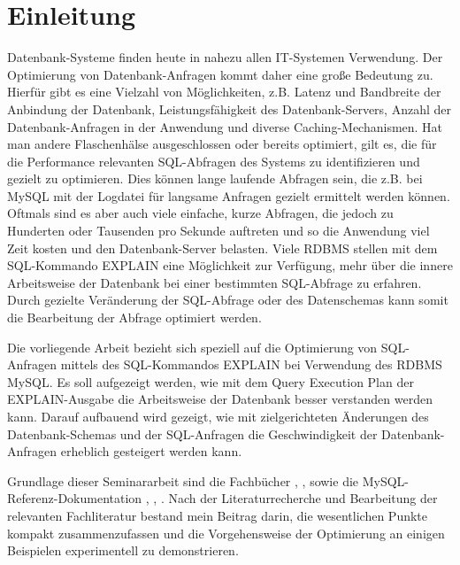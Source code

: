 \section{Einleitung}
Datenbank-Systeme finden heute in nahezu allen IT-Systemen Verwendung.
Der Optimierung von Datenbank-Anfragen kommt daher eine große Bedeutung zu.
Hierfür gibt es eine Vielzahl von Möglichkeiten, z.B. Latenz und Bandbreite der Anbindung der Datenbank, Leistungsfähigkeit des Datenbank-Servers, Anzahl der Datenbank-Anfragen in der Anwendung und diverse Caching-Mechanismen.
Hat man andere Flaschenhälse ausgeschlossen oder bereits optimiert, gilt es, die für die Performance relevanten SQL-Abfragen des Systems zu identifizieren und gezielt zu optimieren. Dies können lange laufende Abfragen sein, die z.B. bei MySQL mit der Logdatei für langsame Anfragen gezielt ermittelt werden können. Oftmals sind es aber auch viele einfache, kurze Abfragen, die jedoch zu Hunderten oder Tausenden pro Sekunde auftreten und so die Anwendung viel Zeit kosten und den Datenbank-Server belasten.
Viele RDBMS stellen mit dem SQL-Kommando EXPLAIN eine Möglichkeit zur Verfügung, mehr über die innere Arbeitsweise der Datenbank bei einer bestimmten SQL-Abfrage zu erfahren. Durch gezielte Veränderung der SQL-Abfrage oder des Datenschemas kann somit die Bearbeitung der Abfrage optimiert werden.

Die vorliegende Arbeit bezieht sich speziell auf die Optimierung von SQL-Anfragen mittels des SQL-Kommandos EXPLAIN bei Verwendung des RDBMS MySQL.
Es soll aufgezeigt werden, wie mit dem Query Execution Plan der EXPLAIN-Ausgabe die Arbeitsweise der Datenbank besser verstanden werden kann. Darauf aufbauend wird gezeigt, wie mit zielgerichteten Änderungen des Datenbank-Schemas und der SQL-Anfragen die Geschwindigkeit der Datenbank-Anfragen erheblich gesteigert werden kann.

Grundlage dieser Seminararbeit sind die Fachbücher \cite{Bradford2011}, \cite{Sauer1998}, \cite{Schwartz2009} sowie die MySQL-Referenz-Dokumentation \cite{refman1}, \cite{refman2}, \cite{refman3}.
Nach der Literaturrecherche und Bearbeitung der relevanten Fachliteratur bestand mein Beitrag darin, die wesentlichen Punkte kompakt zusammenzufassen und die Vorgehensweise der Optimierung an einigen Beispielen experimentell zu demonstrieren.

